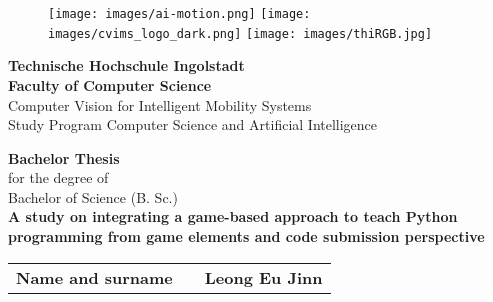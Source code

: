 

\begin{titlepage}	
	\begin{figure}[!h]
		\centering
			\texttt{[image: images/ai-motion.png]}	
			\hfill
			\texttt{[image: images/cvims\_logo\_dark.png]}	
			\hfill
			\texttt{[image: images/thiRGB.jpg]}	
		\end{figure}																			
	
	\begin{center}
		\hrulefill 
	\end{center}
	
	
	\begin{center}	
		\vspace{1cm}
		\huge\textbf{Technische Hochschule Ingolstadt}\\[1em]
		\Large \textbf{Faculty of Computer Science}\\ 
		\normalsize
		Computer Vision for Intelligent Mobility Systems \\ 
		Study Program Computer Science and Artificial Intelligence \\ [2.5em]
	\end{center}


	\begin{center}	
		\vspace{1cm}
		\Large \textbf{Bachelor Thesis}\\ 
		\normalsize
		for the degree of \\ 
		Bachelor of Science (B. Sc.) \\ [3.5em]
		\huge\textbf{A study on integrating a game-based approach to teach Python programming from game elements and code submission perspective}	 \\ [3.5em]
	\end{center}



	
	\begin{center}
		\vspace{1cm}
		\hspace{1cm}
		\begin{tabular}{r@{:}ll}
			\textbf{Name and surname} & & \textbf{Leong Eu Jinn}	\\ [3em]
			

\end{tabular}
\end{center}
\end{titlepage}
